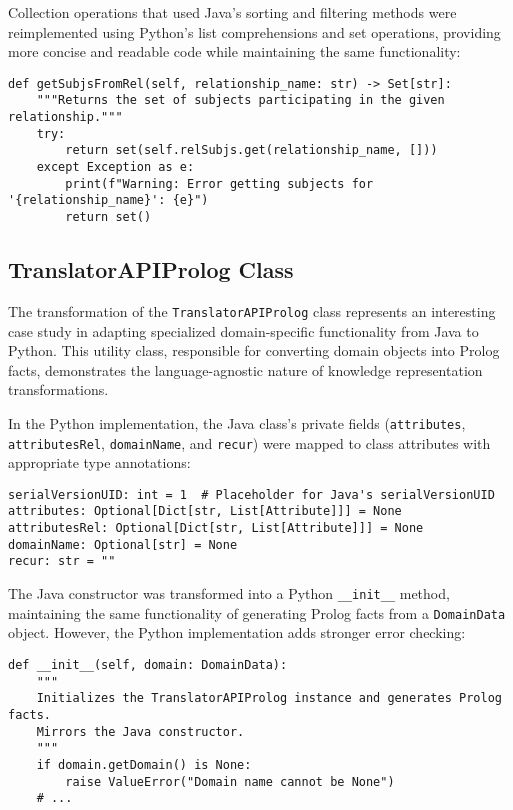 \documentclass[12pt,a4paper]{article}
\begin{document}
Collection operations that used Java's sorting and filtering methods were reimplemented using Python's list comprehensions and set operations, providing more concise and readable code while maintaining the same functionality:

\begin{verbatim}
def getSubjsFromRel(self, relationship_name: str) -> Set[str]:
    """Returns the set of subjects participating in the given relationship."""
    try:
        return set(self.relSubjs.get(relationship_name, []))
    except Exception as e:
        print(f"Warning: Error getting subjects for '{relationship_name}': {e}")
        return set()
\end{verbatim}

\subsection{TranslatorAPIProlog Class}

The transformation of the \texttt{TranslatorAPIProlog} class represents an interesting case study in adapting specialized domain-specific functionality from Java to Python. This utility class, responsible for converting domain objects into Prolog facts, demonstrates the language-agnostic nature of knowledge representation transformations.

In the Python implementation, the Java class's private fields (\texttt{attributes}, \texttt{attributesRel}, \texttt{domainName}, and \texttt{recur}) were mapped to class attributes with appropriate type annotations:

\begin{verbatim}
serialVersionUID: int = 1  # Placeholder for Java's serialVersionUID
attributes: Optional[Dict[str, List[Attribute]]] = None
attributesRel: Optional[Dict[str, List[Attribute]]] = None
domainName: Optional[str] = None
recur: str = ""
\end{verbatim}

The Java constructor was transformed into a Python \texttt{\_\_init\_\_} method, maintaining the same functionality of generating Prolog facts from a \texttt{DomainData} object. However, the Python implementation adds stronger error checking:

\begin{verbatim}
def __init__(self, domain: DomainData):
    """
    Initializes the TranslatorAPIProlog instance and generates Prolog facts.
    Mirrors the Java constructor.
    """
    if domain.getDomain() is None:
        raise ValueError("Domain name cannot be None")
    # ...
\end{verbatim}
\end{document}
